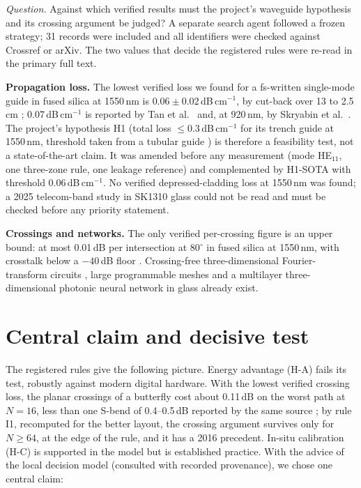 \documentclass[10pt,a4paper]{article}
\newcommand{\dBcm}{\,dB\,cm$^{-1}$\xspace}
\begin{document}
\emph{Question.} Against which verified results must the project's waveguide hypothesis and its crossing argument be judged? A separate search agent followed a frozen strategy; 31 records were included and all identifiers were checked against Crossref or arXiv. The two values that decide the registered rules were re-read in the primary full text.

\textbf{Propagation loss.} The lowest verified loss we found for a fs-written single-mode guide in fused silica at 1550\,nm is $0.06\pm0.02$\dBcm, by cut-back over 13 to 2.5\,cm \cite{Ackermann2025}; 0.07\dBcm is reported by Tan et al.\ \cite{Tan2022} and, at 920\,nm, by Skryabin et al.\ \cite{Skryabin2024}. The project's hypothesis H1 (total loss $\le0.3$\dBcm for its trench guide at 1550\,nm, threshold taken from a tubular guide \cite{Bukharin2015}) is therefore a feasibility test, not a state-of-the-art claim. It was amended before any measurement (mode HE$_{11}$, one three-zone rule, one leakage reference) and complemented by H1-SOTA with threshold 0.06\dBcm. No verified depressed-cladding loss at 1550\,nm was found; a 2025 telecom-band study in SK1310 glass \cite{Zhou2025} could not be read and must be checked before any priority statement.

\textbf{Crossings and networks.} The only verified per-crossing figure is an upper bound: at most 0.01\,dB per intersection at 80$^\circ$ in fused silica at 1550\,nm, with crosstalk below a $-40$\,dB floor \cite{Djogo2026}. Crossing-free three-dimensional Fourier-transform circuits \cite{Crespi2016}, large programmable meshes \cite{Pentangelo2024,Kondratyev2024} and a multilayer three-dimensional photonic neural network in glass \cite{Cao2026} already exist.


\section{Central claim and decisive test}

The registered rules give the following picture. Energy advantage (H-A) fails its test, robustly against modern digital hardware. With the lowest verified crossing loss, the planar crossings of a butterfly cost about 0.11\,dB on the worst path at $N=16$, less than one S-bend of 0.4--0.5\,dB reported by the same source \cite{Djogo2026}; by rule I1, recomputed for the better layout, the crossing argument survives only for $N\ge64$, at the edge of the rule, and it has a 2016 precedent. In-situ calibration (H-C) is supported in the model but is established practice. With the advice of the local decision model (consulted with recorded provenance), we chose one central claim:
\end{document}
